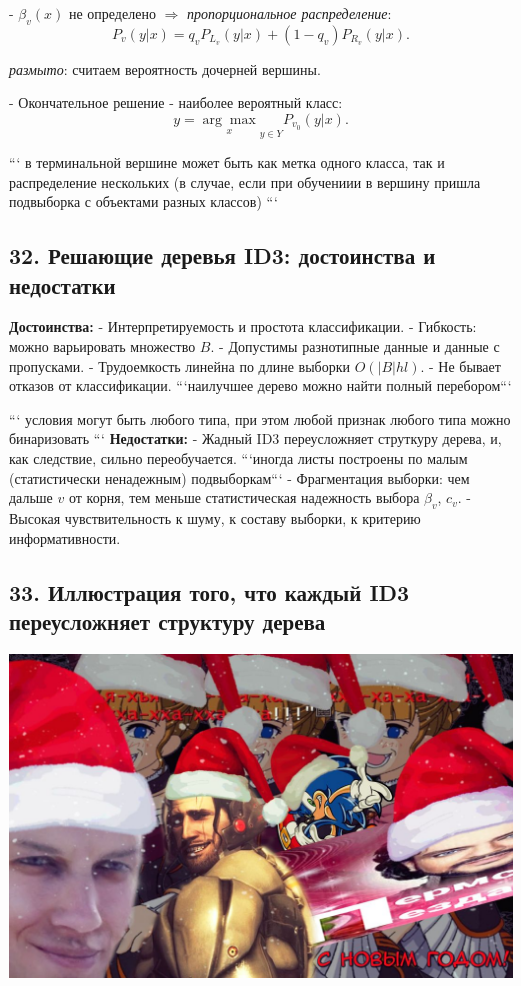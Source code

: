 - $\beta_v{(x)}$ не определено $\Rightarrow$
\textit{пропорциональное распределение}:
$$\displaystyle P_v{(y|x)} = q_v P_{L_v}{\left( y|x \right)} + {\left( 1-q_v \right)} P_{R_v}{\left( y|x \right)}.$$

\textit{размыто}: считаем вероятность дочерней вершины.

- Окончательное решение - наиболее вероятный класс:
$$y = {\underset{x}{\arg\max}}_{y \in Y}{P_{v_0}}{\left( y|x \right)}.$$

```
в терминальной вершине может быть как метка одного класса, так и
распределение нескольких (в случае, если при обучениии в вершину
пришла подвыборка с объектами разных классов)
```

\subsection{32. Решающие деревья ID3: достоинства и недостатки}

\textbf{Достоинства:}
- Интерпретируемость и простота классификации.
- Гибкость: можно варьировать множество $B$.
- Допустимы разнотипные данные и данные с пропусками.
- Трудоемкость линейна по длине выборки $O{\left( {|B|} hl \right)}$.
- Не бывает отказов от классификации. ```наилучшее дерево можно найти полный перебором```

```
условия могут быть любого типа, при этом любой признак любого типа можно
бинаризовать
```
\textbf{Недостатки:}
- Жадный ID3 переусложняет струткуру дерева, и, как следствие, сильно
переобучается. ```иногда листы построены по малым (статистически ненадежным) подвыборкам```
- Фрагментация выборки: чем дальше $v$ от корня, тем меньше статистическая
надежность выбора $\beta_v$, $c_v$.
- Высокая чувствительность к шуму, к составу выборки, к критерию
информативности.

\subsection{33. Иллюстрация того, что каждый ID3 переусложняет структуру дерева}

\includegraphics[scale=0.3]{figures/samplefigure.jpg}

